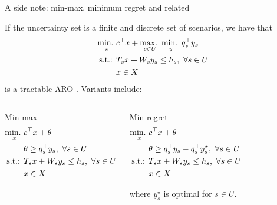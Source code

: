 \begin{frame}{A side note: min-max, minimum regret and related}

If the uncertainty set is a finite and discrete set of scenarios, we have that 
%
\begin{align*}
	\mathop{\text{min.} \ }_x & c^\top x + \mathop{\text{max.} \ }_{s \in U} \mathop{\text{min.} \ }_{y}q_s^\top y_s \\
	\text{s.t.: } & T_sx + W_s y_s \le h_s, \ \forall s \in U \\
	& x \in X
\end{align*}
%
is a \alert{tractable} ARO \cite{mulvey1995robust}. \pause Variants include:

\vspace{-12pt}
\begin{columns}
	\begin{block}{Min-max}
	\vspace{-18pt} 
		\begin{align*}
			\mathop{\text{min.} \ }_x & c^\top x + \theta \\
			& \theta \ge q_s^\top y_s, \ \forall s \in U \\
			\text{s.t.: } & T_s x + W_s y_s \le h_s, \ \forall s \in U \\
			& x \in X
		\end{align*}
	\end{block}	
		\begin{block}{Min-regret}
	\vspace{-18pt} 
		\begin{align*}
			\mini_x & c^\top x + \theta \\
			& \theta \ge q_s^\top y_s - q_s^\top y^\star_s, \ \forall s \in U \\
			\text{s.t.: } & T_sx + W_s y_s \le h_s, \ \forall s \in U \\
			& x \in X
		\end{align*}
		
		\vspace{-12pt}
		where $y^\star_s$ is optimal for $s \in U$.
	\end{block}	
\end{columns}
	
\end{frame}


